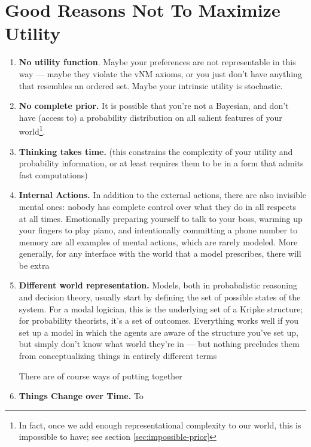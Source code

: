 \documentclass{article}
\begin{document}
	\section{Good Reasons Not To Maximize Utility}
	\begin{enumerate}
		\item \textbf{No utility function}. Maybe your preferences are not representable in this way --- maybe they violate the vNM axioms, or you just don't have anything that resembles an ordered set. Maybe your intrinsic utility is stochastic.
		
		\item \textbf{No complete prior.} It is possible that you're not a Bayesian, and don't have (access to) a probability distribution on all salient features of your world\footnote{In fact, once we add enough representational complexity to our world, this is impossible to have; see section \ref{sec:impossible-prior}}.  
		
		\item \textbf{Thinking takes time.} (this constrains the complexity of your utility and probability information, or at least requires them to be in a form that admits fast computations)
		
		\item \textbf{Internal Actions.} In addition to the external actions, there are also invisible mental ones: nobody has complete control over what they do in all respects at all times. Emotionally preparing yourself to talk to your boss, warming up your fingers to play piano, and intentionally committing a phone number to memory are all examples of mental actions, which are rarely modeled. More generally, for any interface with the world that a model prescribes, there will be extra 
		
		\item \textbf{Different world representation.} 
			Models, both in probabalistic reasoning and decision theory, usually start by defining the set of possible states of the system. For a modal logician, this is the underlying set of a Kripke structure; for probability theorists, it's a set of outcomes. Everything works well if you set up a model in which the agents are aware of the structure you've set up, but simply don't know what world they're in --- but nothing precludes them from conceptualizing things in entirely different terms
			
			There are of course ways of putting together
		
		
		\item \textbf{Things Change over Time.} To 
	\end{enumerate}	
\end{document}
